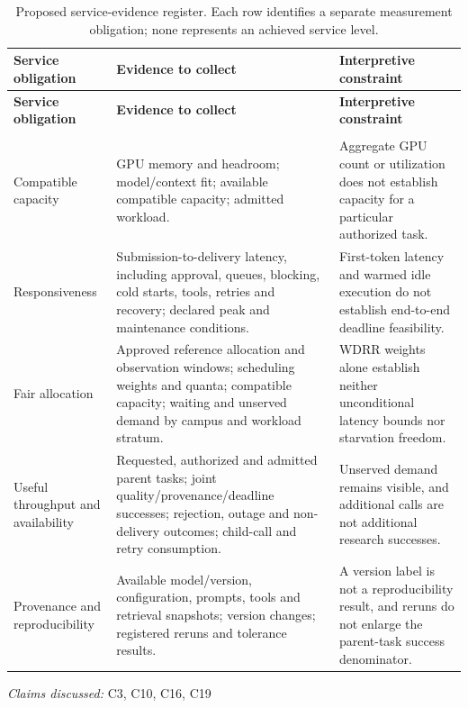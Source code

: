 \documentclass[11pt]{article}
\begin{document}
\begin{longtable}{@{}>{\raggedright\arraybackslash}p{}>{\raggedright\arraybackslash}p{}>{\raggedright\arraybackslash}p{}@{}}
\caption{Proposed service-evidence register. Each row identifies a separate measurement obligation; none represents an achieved service level.}\\
\toprule
\textbf{Service obligation} & \textbf{Evidence to collect} & \textbf{Interpretive constraint}\\
\midrule
\endfirsthead
\toprule
\textbf{Service obligation} & \textbf{Evidence to collect} & \textbf{Interpretive constraint}\\
\midrule
\endhead
\midrule
\multicolumn{3}{r}{\footnotesize Continued on next page}\\
\endfoot
\bottomrule
\endlastfoot
Compatible capacity & GPU memory and headroom; model/context fit; available compatible capacity; admitted workload. & Aggregate GPU count or utilization does not establish capacity for a particular authorized task.\\
Responsiveness & Submission-to-delivery latency, including approval, queues, blocking, cold starts, tools, retries and recovery; declared peak and maintenance conditions. & First-token latency and warmed idle execution do not establish end-to-end deadline feasibility.\\
Fair allocation & Approved reference allocation and observation windows; scheduling weights and quanta; compatible capacity; waiting and unserved demand by campus and workload stratum. & WDRR weights alone establish neither unconditional latency bounds nor starvation freedom.\\
Useful throughput and availability & Requested, authorized and admitted parent tasks; joint quality/provenance/deadline successes; rejection, outage and non-delivery outcomes; child-call and retry consumption. & Unserved demand remains visible, and additional calls are not additional research successes.\\
Provenance and reproducibility & Available model/version, configuration, prompts, tools and retrieval snapshots; version changes; registered reruns and tolerance results. & A version label is not a reproducibility result, and reruns do not enlarge the parent-task success denominator.\\
\end{longtable}
\par{}
\textit{Claims discussed: }C3, C10, C16, C19
\end{document}
